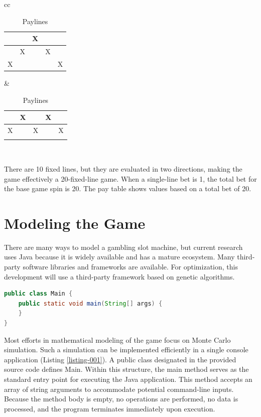 \documentclass[12pt,twoside,openany]{book}
\begin{document}
\begin{table}[htbp]
\begin{tabular}{cc}
\begin{tabular}{|c|c|c|c|c|}
\hline
 & & X & & \\ \hline
 & X & & X & \\ \hline
X & & & & X \\ \hline
\end{tabular}
&
\begin{tabular}{|c|c|c|c|c|}
\hline
 & X & & X & \\ \hline
X & & X & & X \\ \hline
 & & & & \\ \hline
\end{tabular} \\
\end{tabular}
\caption{Paylines}
\end{table}

There are 10 fixed lines, but they are evaluated in two directions, making the game effectively a 20-fixed-line game. When a single-line bet is 1, the total bet for the base game spin is 20. The pay table shows values based on a total bet of 20.

\chapter{Modeling the Game}

There are many ways to model a gambling slot machine, but current research uses Java because it is widely available and has a mature ecosystem. Many third-party software libraries and frameworks are available. For optimization, this development will use a third-party framework based on genetic algorithms.

\begin{lstlisting}[language=Java, caption={Console application single entry point}, label=listing-001]
public class Main {
    public static void main(String[] args) {
    }
}
\end{lstlisting}

Most efforts in mathematical modeling of the game focus on Monte Carlo simulation. Such a simulation can be implemented efficiently in a single console application (Listing \ref{listing-001}). A public class designated in the provided source code defines Main. Within this structure, the main method serves as the standard entry point for executing the Java application. This method accepts an array of string arguments to accommodate potential command-line inputs. Because the method body is empty, no operations are performed, no data is processed, and the program terminates immediately upon execution.
\end{document}
